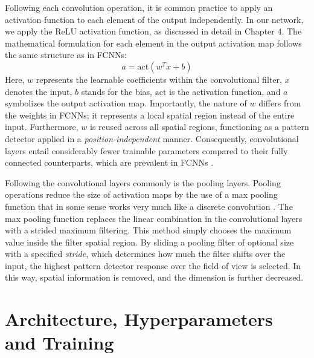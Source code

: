 \documentclass[a4paper, UKenglish, 11pt]{uiomaster}
\begin{document}
Following each convolution operation, it is common practice to apply an activation function to each element of the output independently. In our network, we apply the ReLU activation function, as discussed in detail in Chapter 4. The mathematical formulation for each element in the output activation map follows the same structure as in FCNNs:
\begin{equation}
a = \text{act}(w^{T}x + b)
\end{equation}
Here, $w$ represents the learnable coefficients within the convolutional filter, $x$ denotes the input, $b$ stands for the bias, $\text{act}$ is the activation function, and $a$ symbolizes the output activation map. Importantly, the nature of $w$ differs from the weights in FCNNs; it represents a local spatial region instead of the entire input. Furthermore, $w$ is reused across all spatial regions, functioning as a pattern detector applied in a \emph{position-independent} manner. Consequently, convolutional layers entail considerably fewer trainable parameters compared to their fully connected counterparts, which are prevalent in FCNNs \cite{IN5400-Lecture3}.

Following the convolutional layers commonly is the pooling layers. Pooling operations reduce the size of activation maps by the use of a max pooling function that in some sense works very much like a discrete convolution \cite{dumoulin2018}. The max pooling function replaces the linear combination in the convolutional layers with a strided maximum filtering. This method simply chooses the maximum value inside the filter spatial region. By sliding a pooling filter of optional size with a specified \emph{stride}, which determines how much the filter shifts over the input, the highest pattern detector response over the field of view is selected. In this way, spatial information is removed, and the dimension is further decreased.


\section{Architecture, Hyperparameters and Training}
\end{document}

